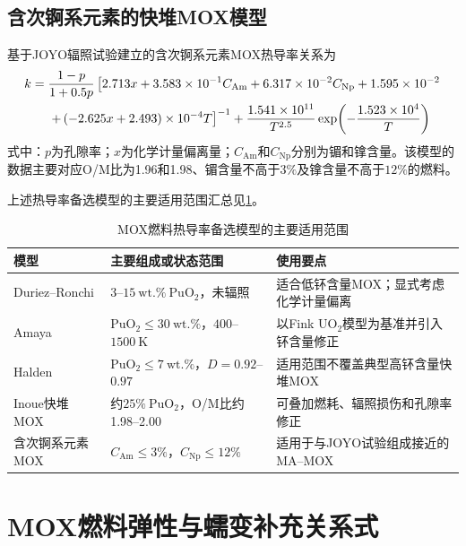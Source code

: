 \subsection{含次锕系元素的快堆MOX模型}

基于JOYO辐照试验建立的含次锕系元素MOX热导率关系为
\begin{align}
	k={}&\frac{1-p}{1+0.5p}
	\left[
	2.713x+3.583\times10^{-1}C_{\mathrm{Am}}
	+6.317\times10^{-2}C_{\mathrm{Np}}
	+1.595\times10^{-2}
	\right.\notag\\
	&\left.
	+\left(-2.625x+2.493\right)\times10^{-4}T
	\right]^{-1}
	+\frac{1.541\times10^{11}}{T^{2.5}}
	\exp\!\left(-\frac{1.523\times10^4}{T}\right)
	\label{eq:appendix_minor_actinide_mox_thermal_conductivity}
\end{align}
\noindent 式中：$p$为孔隙率；$x$为化学计量偏离量；$C_{\mathrm{Am}}$和$C_{\mathrm{Np}}$分别为镅和镎含量。该模型的数据主要对应O/M比为1.96和1.98、镅含量不高于$3\%$及镎含量不高于$12\%$的燃料。

上述热导率备选模型的主要适用范围汇总见\tablename\ref{tab:appendix_mox_thermal_conductivity_scope}。

\begin{table}[htbp]
	\centering
	\renewcommand{\arraystretch}{1.20}
	\caption{MOX燃料热导率备选模型的主要适用范围}
	\label{tab:appendix_mox_thermal_conductivity_scope}
	\begin{tabularx}{\textwidth}{p{3.3cm}p{4.0cm}X}
		\toprule
		模型 & 主要组成或状态范围 & 使用要点 \\
		\midrule
		Duriez--Ronchi & $3$--$15\ \mathrm{wt.\%}\ \mathrm{PuO}_2$，未辐照 & 适合低钚含量MOX；显式考虑化学计量偏离 \\
		Amaya & $\mathrm{PuO}_2\leq30\ \mathrm{wt.\%}$，$400$--$1500\ \mathrm{K}$ & 以Fink $\mathrm{UO}_2$模型为基准并引入钚含量修正 \\
		Halden & $\mathrm{PuO}_2\leq7\ \mathrm{wt.\%}$，$D=0.92$--$0.97$ & 适用范围不覆盖典型高钚含量快堆MOX \\
		Inoue快堆MOX & 约$25\%\ \mathrm{PuO}_2$，O/M比约1.98--2.00 & 可叠加燃耗、辐照损伤和孔隙率修正 \\
		含次锕系元素MOX & $C_{\mathrm{Am}}\leq3\%$，$C_{\mathrm{Np}}\leq12\%$ & 适用于与JOYO试验组成接近的MA--MOX \\
		\bottomrule
	\end{tabularx}
\end{table}

\section{MOX燃料弹性与蠕变补充关系式}
\label{app:mox_mechanical_correlations}

